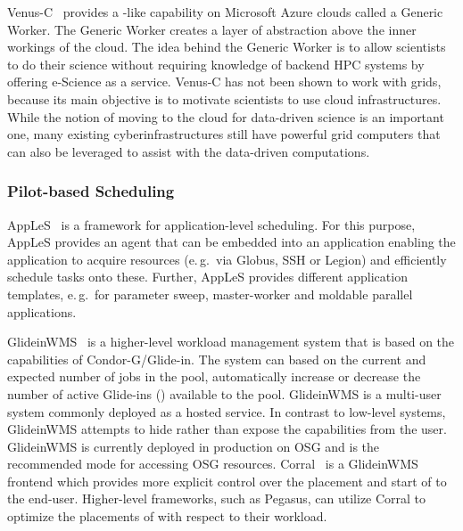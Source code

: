 \documentclass{sig-alternate}
\begin{document}
Venus-C~\cite{venusc-generic-worker} provides a \pilotjob-like
capability on Microsoft Azure clouds called a Generic Worker. The
Generic Worker creates a layer of abstraction above the inner workings
of the cloud.  The idea behind the Generic Worker is to allow
scientists to do their science without requiring knowledge of backend
HPC systems by offering e-Science as a service. Venus-C has not been
shown to work with grids, because its main objective is to motivate
scientists to use cloud infrastructures.  While the notion of moving
to the cloud for data-driven science is an important one, many
existing cyberinfrastructures still have powerful grid computers that
can also be leveraged to assist with the data-driven computations.


\subsubsection{Pilot-based Scheduling}
AppLeS~\cite{Berman:2003:ACG:766629.766632} is a framework for 
application-level scheduling. For this purpose, AppLeS provides an agent that 
can be embedded into an application enabling the application to acquire 
resources (e.\,g.\ via Globus, SSH or Legion) and efficiently schedule tasks 
onto these. Further, AppLeS provides different application templates,
e.\,g.\ for parameter sweep, master-worker and moldable parallel applications.

 

GlideinWMS~\cite{1742-6596-119-6-062044} is a higher-level workload management
system that is based on the \pilot capabilities of Condor-G/Glide-in. The
system can based on the current and expected number of jobs in the pool,
automatically increase or decrease the number of active Glide-ins (\pilots)
available to the pool. GlideinWMS is a multi-user \pilotjob system commonly
deployed as a hosted service. In contrast to low-level \pilotjob systems,
GlideinWMS attempts to hide rather than expose the \pilot capabilities from
the user. GlideinWMS is currently deployed in production on OSG and is the
recommended mode for accessing OSG resources.
Corral~\cite{Rynge:2011:EUG:2116259.2116599} is a GlideinWMS frontend which
provides more explicit control over the placement and start of \pilots to the
end-user. Higher-level frameworks, such as Pegasus, can utilize Corral to
optimize the placements of \pilots with respect to their workload.
\end{document}
